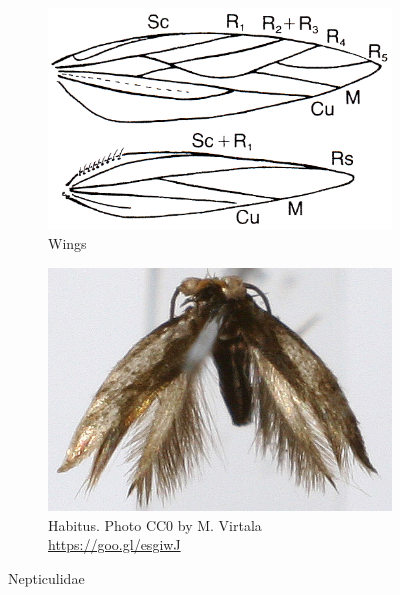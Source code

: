 \documentclass[letterpaper, 11pt]{article}
\begin{document}
\begin{figure}[ht!]
    \centering
    \begin{subfigure}[ht!]{0.4\textwidth}
        \includegraphics[width=\textwidth]{image29}
        \caption{Wings}%
        \label{fig:nepticulid2}
    \end{subfigure}
    \qquad %
    \begin{subfigure}[ht!]{0.45\textwidth}
        \includegraphics[width=\textwidth]{nepticulid1}
        \caption{Habitus. Photo CC0 by M. Virtala \url{https://goo.gl/esgiwJ}}
        \label{fig:nepticulid1}
    \end{subfigure}
    \caption{Nepticulidae}\label{fig:nepticulids}
\end{figure}
\end{document}
